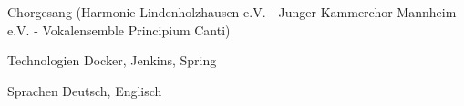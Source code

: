 

\begin{cvskills}

  \cvskill
    {} %
    {Chorgesang (Harmonie Lindenholzhausen e.V. - Junger Kammerchor Mannheim e.V. - Vokalensemble Principium Canti)} %

  \cvskill
    {Technologien} %
    {Docker, Jenkins, Spring} %

  \cvskill
    {Sprachen} %
    {Deutsch, Englisch} %

\end{cvskills}
